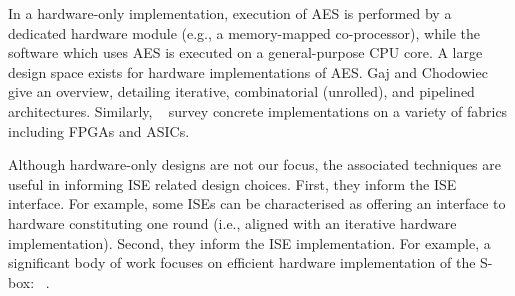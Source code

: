 
In a hardware-only implementation,
execution of 
AES
is 
performed by 
a dedicated hardware module (e.g., a memory-mapped co-processor),
while
the software which uses AES is executed on
a general-purpose CPU core.
A large design space exists for hardware implementations of AES.
Gaj and Chodowiec~\cite[Section 3.3]{GajCho:00}
give an overview, detailing
iterative,
combinatorial (unrolled),
and
pipelined architectures.
Similarly, ~\cite{PMDW:04,GooBen:05,GajCho:09}
survey concrete implementations on a variety of fabrics including FPGAs
and ASICs.

Although hardware-only designs are not our focus, the associated techniques
are useful in informing ISE related design choices.
First,
they inform the ISE interface.
For example, some ISEs can be characterised as offering an interface to
hardware constituting one round 
(i.e., aligned with an iterative hardware implementation).
Second,
they inform the ISE implementation.
For example, a significant body of work focuses on efficient hardware 
implementation of the S-box: ~\cite{Canright:05,BoyPer:12,ReyTahAsh:18}.

